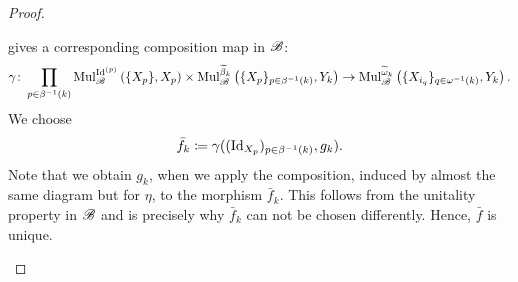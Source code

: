 \begin{proof}
\begin{enumerate}
\begin{center}
        \end{center}
        gives a corresponding composition map in $\mathscr{B}$:
        $$
            \gamma \colon \prod_{p \in {\beta^{-1}(k)}} \operatorname{Mul}_{\mathscr{B}}^{\operatorname{Id}^{(p)}}\left(\{X_{p}\}, X_{p}\right)\times \operatorname{Mul}_{\mathscr{B}}^{\widetilde{\beta}_k}\left(\{X_p\}_{p\in \beta^{-1}(k)}, Y_k\right) \to \operatorname{Mul}_{\mathscr{B}}^{\widetilde{\omega}_k} \left(\{X_{i_q}\}_{q \in \omega^{-1}(k)}, Y_k\right).
        $$
        We choose
        \[
            \bar{f}_k \coloneqq \gamma((\operatorname{Id}_{X_p})_{p \in {\beta^{-1}(k)}}, g_k).
        \]
        Note that we obtain $g_k$, when we apply the composition, induced by 
        almost the same diagram but for
        $\eta$, to the morphism $\bar{f}_k$. This follows from the unitality
        property in $\mathscr{B}$ and is precisely why $\bar{f}_k$ can not be chosen
        differently. Hence, $\bar{f}$ is unique. 
        

\end{enumerate}
\end{proof}
